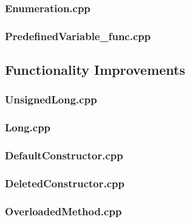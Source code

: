 \documentclass[11pt,]{report}
\begin{document}
\begin{appendix}
\subsubsection{Enumeration.cpp}
\label{sub:Enumeration}


\subsubsection{PredefinedVariable\_func.cpp}
\label{sub:PredefinedVariable_func}


\subsection{Functionality Improvements}
\label{subsection:Functionality}

\subsubsection{UnsignedLong.cpp}
\label{sub:UnsignedLong.cpp}


\subsubsection{Long.cpp}
\label{sub:LongLong}


\subsubsection{DefaultConstructor.cpp}
\label{sub:DefaultConstructor}


\subsubsection{DeletedConstructor.cpp}
\label{sub:DeletedConstructor}


\subsubsection{OverloadedMethod.cpp}
\label{sub:OverloadedMethod.cpp}


\end{appendix}
\end{document}
